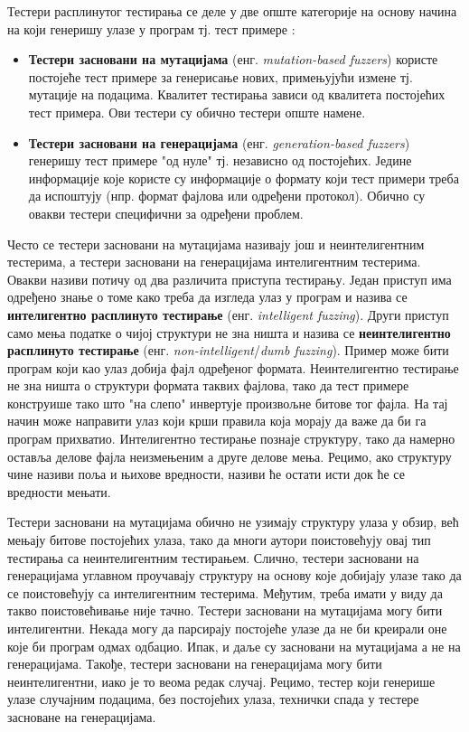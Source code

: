 \documentclass[12pt,oneside]{memoir}
\begin{document}
Тестери расплинутог тестирања се деле у две опште категорије на основу начина на који генеришу улазе у програм тј. тест примере \cite{fuzzingBrute, fuzzing}:
\begin{itemize}
\item \textbf{Тестери засновани на мутацијама} (енг. \textit{mutation-based fuzzers}) користе постојеће тест примере за генерисање нових, примењујући измене тј. мутације на подацима. Квалитет тестирања зависи од квалитета постојећих тест примера. Ови тестери су обично тестери опште намене. 
\item \textbf{Тестери засновани на генерацијама} (енг. \textit{generation-based fuzzers}) генеришу тест примере "од нуле" тј. независно од постојећих. Једине информације које користе су информације о формату који тест примери треба да испоштују (нпр. формат фајлова или одређени протокол). Обично су овакви тестери специфични за одређени проблем.
\end{itemize}
Често се тестери засновани на мутацијама називају још и неинтелигентним тестерима, а тестери засновани на генерацијама интелигентним тестерима. Овакви називи потичу од два различита приступа тестирању. Један приступ има одређено знање о томе како треба да изгледа улаз у програм и назива се \textbf{интелигентно расплинуто тестирање} (енг. \textit{intelligent fuzzing}). Други приступ само мења податке о чијој структури не зна ништа и назива се \textbf{неинтелигентно расплинуто тестирање} (енг. \textit{non-intelligent}/\textit{dumb fuzzing}). Пример може бити програм који као улаз добија фајл одређеног формата. Неинтелигентно тестирање не зна ништа о структури формата таквих фајлова, тако да тест примере конструише тако што "на слепо" инвертује произвољне битове тог фајла. На тај начин може направити улаз који крши правила која морају да важе да би га програм прихватио. Интелигентно тестирање познаје структуру, тако да намерно оставља делове фајла неизмењеним а друге делове мења. Рецимо, ако структуру чине називи поља и њихове вредности, називи ће остати исти док ће се вредности мењати.

Тестери засновани на мутацијама обично не узимају структуру улаза у обзир, већ мењају битове  постојећих улаза, тако да многи аутори поистовећују овај тип тестирања са неинтелигентним тестирањем. Слично, тестери засновани на генерацијама углавном проучавају структуру на основу које добијају улазе тако да се поистовећују са интелигентним тестерима. Међутим, треба имати у виду да такво поистовећивање није тачно. Тестери засновани на мутацијама могу бити интелигентни. Некада могу да парсирају постојеће улазе да не би креирали оне које би програм одмах одбацио. Ипак, и даље су засновани на мутацијама а не на генерацијама. Такође, тестери засновани на генерацијама могу бити неинтелигентни, иако је то веома редак случај. Рецимо, тестер који генерише улазе случајним подацима, без постојећих улаза, технички спада у тестере засноване на генерацијама. 
\end{document}
